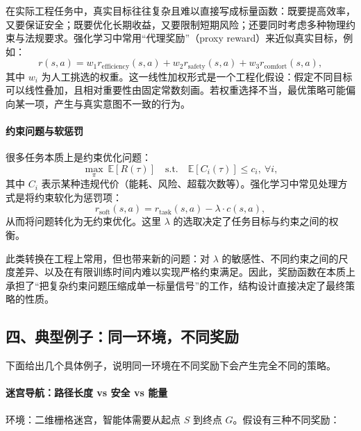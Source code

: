 在实际工程任务中，真实目标往往复杂且难以直接写成标量函数：既要提高效率，又要保证安全；既要优化长期收益，又要限制短期风险；还要同时考虑多种物理约束与法规要求。强化学习中常用“代理奖励”（proxy reward）来近似真实目标，例如：
\[
r(s,a) = w_1 r_{\text{efficiency}}(s,a)
+ w_2 r_{\text{safety}}(s,a)
+ w_3 r_{\text{comfort}}(s,a),
\]
其中 $w_i$ 为人工挑选的权重。这一线性加权形式是一个工程化假设：假定不同目标可以线性叠加，且相对重要性由固定常数刻画。若权重选择不当，最优策略可能偏向某一项，产生与真实意图不一致的行为。

\paragraph{约束问题与软惩罚}

很多任务本质上是约束优化问题：
\[
\max_\pi~ \mathbb{E}[R(\tau)] \quad
\text{s.t.} \quad \mathbb{E}[C_i(\tau)] \le c_i,\ \forall i,
\]
其中 $C_i$ 表示某种违规代价（能耗、风险、超载次数等）。强化学习中常见处理方式是将约束软化为惩罚项：
\[
r_{\text{soft}}(s,a) = r_{\text{task}}(s,a) - \lambda \cdot c(s,a),
\]
从而将问题转化为无约束优化。这里 $\lambda$ 的选取决定了任务目标与约束之间的权衡。

此类转换在工程上常用，但也带来新的问题：对 $\lambda$ 的敏感性、不同约束之间的尺度差异、以及在有限训练时间内难以实现严格约束满足。因此，奖励函数在本质上承担了“把复杂约束问题压缩成单一标量信号”的工作，结构设计直接决定了最终策略的性质。

\subsection*{四、典型例子：同一环境，不同奖励}

下面给出几个具体例子，说明同一环境在不同奖励下会产生完全不同的策略。

\paragraph{迷宫导航：路径长度 vs 安全 vs 能量}

环境：二维栅格迷宫，智能体需要从起点 $S$ 到终点 $G$。假设有三种不同奖励：

